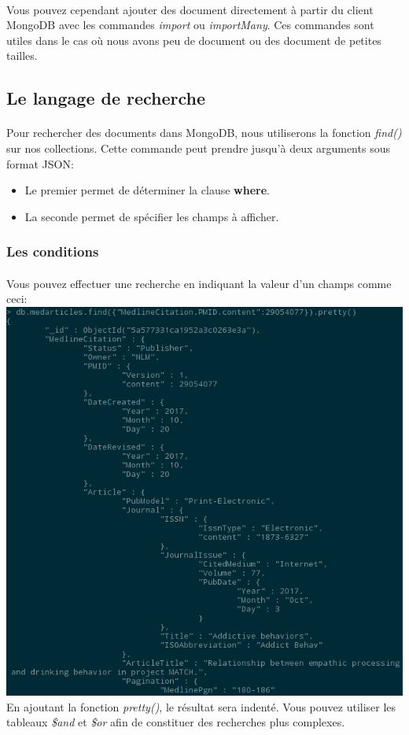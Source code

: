 \documentclass{article}
\begin{document}
  \paragraph{} Vous pouvez cependant ajouter des document directement à partir
  du client MongoDB avec les commandes \emph{import} ou \emph{importMany}.
  Ces commandes sont utiles dans le cas où nous avons peu de document ou des
  document de petites tailles.
  
\subsection{Le langage de recherche}
  \paragraph{} Pour rechercher des documents dans MongoDB, nous utiliserons la 
  fonction \emph{find()} sur nos collections. Cette commande peut prendre jusqu'à
  deux arguments sous format JSON:
  \begin{itemize}
    \item Le premier permet de déterminer la clause \textbf{where}.
    \item La seconde permet de spécifier les champs à afficher.
  \end{itemize}
  \subsubsection{Les conditions}
    \paragraph{} Vous pouvez effectuer une recherche en indiquant la valeur d'un
    champs comme ceci:\\
    \includegraphics[scale=0.8]{mongodb/recherche_find1.png}\\
    En ajoutant la fonction \emph{pretty()}, le résultat sera indenté.
    Vous pouvez utiliser les tableaux \emph{\$and} et \emph{\$or} afin de constituer
    des recherches plus complexes.
\end{document}
